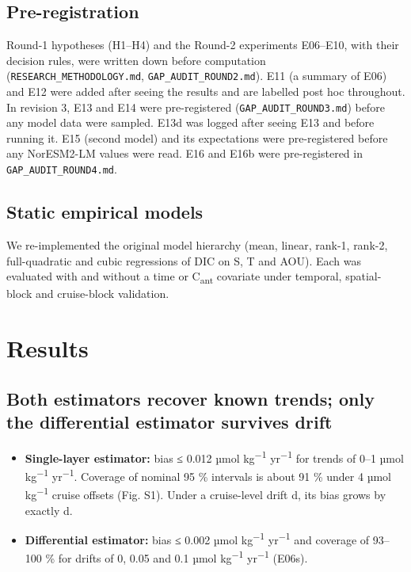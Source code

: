 \documentclass[11pt]{article}
\providecommand{\tightlist}{\setlength{\itemsep}{0pt}\setlength{\parskip}{0pt}}
\begin{document}
\subsection{Pre-registration}\label{pre-registration}

Round-1 hypotheses (H1--H4) and the Round-2 experiments E06--E10, with
their decision rules, were written down before computation
(\texttt{RESEARCH\_METHODOLOGY.md}, \texttt{GAP\_AUDIT\_ROUND2.md}). E11
(a summary of E06) and E12 were added after seeing the results and are
labelled post hoc throughout. In revision 3, E13 and E14 were
pre-registered (\texttt{GAP\_AUDIT\_ROUND3.md}) before any model data
were sampled. E13d was logged after seeing E13 and before running it.
E15 (second model) and its expectations were pre-registered before any
NorESM2-LM values were read. E16 and E16b were pre-registered in
\texttt{GAP\_AUDIT\_ROUND4.md}.

\subsection{Static empirical models}\label{static-empirical-models}

We re-implemented the original model hierarchy (mean, linear, rank-1,
rank-2, full-quadratic and cubic regressions of DIC on S, T and AOU).
Each was evaluated with and without a time or C\textsubscript{ant}
covariate under temporal, spatial-block and cruise-block validation.

\section{Results}\label{results}

\subsection{Both estimators recover known trends; only the differential
estimator survives
drift}\label{both-estimators-recover-known-trends-only-the-differential-estimator-survives-drift}

\begin{itemize}
\tightlist
\item
  \textbf{Single-layer estimator:} bias ≤ 0.012 µmol
  kg\textsuperscript{−1} yr\textsuperscript{−1} for trends of 0--1 µmol
  kg\textsuperscript{−1} yr\textsuperscript{−1}. Coverage of nominal 95
  \% intervals is about 91 \% under 4 µmol kg\textsuperscript{−1} cruise
  offsets (Fig. S1). Under a cruise-level drift d, its bias grows by
  exactly d.
\item
  \textbf{Differential estimator:} bias ≤ 0.002 µmol
  kg\textsuperscript{−1} yr\textsuperscript{−1} and coverage of 93--100
  \% for drifts of 0, 0.05 and 0.1 µmol kg\textsuperscript{−1}
  yr\textsuperscript{−1} (E06s).
\end{itemize}
\end{document}
